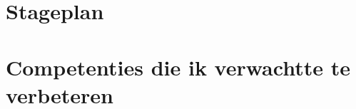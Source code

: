 \documentclass[11pt,a4paper]{report}
\begin{document}

\tableofcontents
\clearpage
{}















\appendix
\chapter{Stageplan}


\chapter{Competenties die ik verwachtte te verbeteren}

\end{document}
